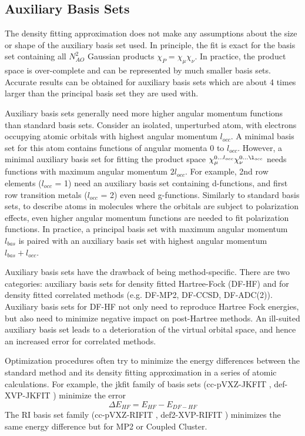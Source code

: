 \subsection{Auxiliary Basis Sets}

The density fitting approximation does not make any assumptions about the size or shape of the auxiliary basis set used. In principle, the fit is exact for the basis set containing all $N_{AO}^2$ Gaussian products $\chi_P = \chi_{\mu} \chi_{\nu}$. In practice, the product space is over-complete and can be represented by much smaller basis sets. Accurate results can be obtained for auxiliary basis sets which are about 4 times larger than the principal basis set they are used with. 

Auxiliary basis sets generally need more higher angular momentum functions than standard basis sets. Consider an isolated, unperturbed atom, with electrons occupying atomic orbitals with highest angular momentum $l_{occ}$. A minimal basis set for this atom contains functions of angular momenta 0 to $l_{occ}$. However, a minimal auxiliary basis set for fitting the product space $\chi_{\mu}^{0...l_{occ}} \chi_{\nu}^{0...\l_{occ}}$ needs functions with maximum angular momentum $2l_{occ}$. For example, 2nd row elements ($l_{occ}$ = 1) need an auxiliary basis set containing d-functions, and first row transition metals ($l_{occ}$ = 2) even need g-functions. Similarly to standard basis sets, to describe atoms in molecules where the orbitals are subject to polarization effects, even higher angular momentum functions are needed to fit polarization functions. In practice, a principal basis set with maximum angular momentum $l_{bas}$ is paired with an auxiliary basis set with highest angular momentum $l_{bas} + l_{occ}$. 

Auxiliary basis sets have the drawback of being method-specific. There are two categories: auxiliary basis sets for density fitted Hartree-Fock (DF-HF) and for density fitted correlated methods (e.g. DF-MP2, DF-CCSD, DF-ADC(2)). Auxiliary basis sets for DF-HF not only need to reproduce Hartree Fock energies, but also need to minimize negative impact on post-Hartree methods. An ill-suited auxiliary basis set leads to a deterioration of the virtual orbital space, and hence an increased error for correlated methods. 

Optimization procedures often try to minimize the energy differences between the standard method and its density fitting approximation in a series of atomic calculations. For example, the jkfit family of basis sets (cc-pVXZ-JKFIT \cite{Wei2002}, def-XVP-JKFIT \cite{Wei2008}) minimize the error
\begin{equation}
\Delta E_{HF} = E_{HF} - E_{DF-HF}
\end{equation}
The RI basis set family (cc-pVXZ-RIFIT \cite{Wei1998}, def2-XVP-RIFIT \cite{Ber1998}) minimizes the same energy difference but for MP2 or Coupled Cluster. 

